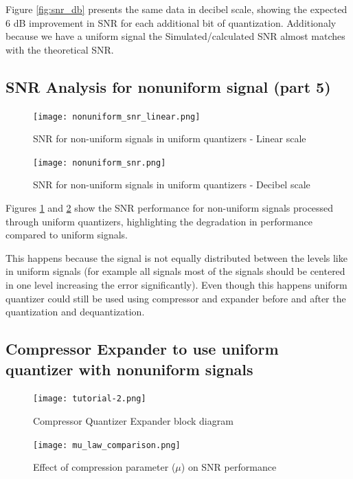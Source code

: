\documentclass{article}
\begin{document}
Figure \ref{fig:snr_db} presents the same data in decibel scale, showing the expected 6 dB improvement in SNR for each additional bit of quantization.  Additionaly because we have a uniform signal the Simulated/calculated SNR almost matches with the theoretical SNR.

\subsection{SNR Analysis for nonuniform signal (part 5)}

\begin{figure}[H]
    \centering
    \texttt{[image: nonuniform\_snr\_linear.png]}
    \caption{SNR for non-uniform signals in uniform quantizers - Linear scale}
    \label{fig:nonuniform_linear}
\end{figure}

\begin{figure}[H]
    \centering
    \texttt{[image: nonuniform\_snr.png]}
    \caption{SNR for non-uniform signals in uniform quantizers - Decibel scale}
    \label{fig:nonuniform_db}
\end{figure}

Figures \ref{fig:nonuniform_linear} and \ref{fig:nonuniform_db} show the SNR performance for non-uniform signals processed through uniform quantizers, highlighting the degradation in performance compared to uniform signals.

\vspace{0.5cm}

This happens because the signal is not equally distributed between the levels like in uniform signals (for example all signals most of the signals should be centered in one level increasing the error significantly). Even though this happens uniform quantizer could still be used using compressor and expander before and after the quantization and dequantization.


\subsection{Compressor Expander to use uniform quantizer with nonuniform signals}

\begin{figure}[H]
    \centering
    \texttt{[image: tutorial-2.png]}
    \caption{Compressor Quantizer Expander block diagram}
    \label{fig:tutorial-compressor}
\end{figure}

\begin{figure}[H]
    \centering
    \texttt{[image: mu\_law\_comparison.png]}
    \caption{Effect of compression parameter ($\mu$) on SNR performance}
    \label{fig:expander}
\end{figure}
\end{document}
